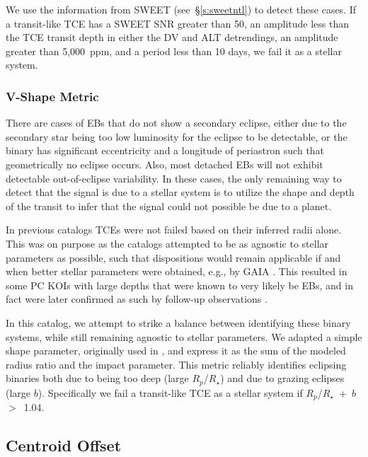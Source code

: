 We use the information from SWEET (see~\S\ref{s:sweetntl}) to detect these cases. If a transit-like TCE has a SWEET SNR greater than 50, an amplitude less than the TCE transit depth in either the DV and ALT detrendings, an amplitude greater than 5,000~ppm, and a period less than 10 days, we fail it as a stellar system.



\subsubsection{V-Shape Metric}
\label{s:shapemetric}
There are cases of EBs that do not show a secondary eclipse, either due to the secondary star being too low luminosity for the eclipse to be detectable, or the binary has significant eccentricity and a longitude of periastron such that geometrically no eclipse occurs. Also, most detached EBs will not exhibit detectable out-of-eclipse variability. In these cases, the only remaining way to detect that the signal is due to a stellar system is to utilize the shape and depth of the transit to infer that the signal could not possible be due to a planet.

In previous catalogs \citep{Rowe2015cat,Mullally2015cat,Coughlin2016} TCEs were not failed based on their inferred radii alone. This was on purpose as the catalogs attempted to be as agnostic to stellar parameters as possible, such that dispositions would remain applicable if and when better stellar parameters were obtained, e.g., by GAIA \citep{Cacciari2009,Mignard2005}. This resulted in some PC KOIs with large depths that were known to very likely be EBs, and in fact were later confirmed as such by follow-up observations \citep{Santerne2016}.

In this catalog, we attempt to strike a balance between identifying these binary systems, while still remaining agnostic to stellar parameters. We adapted a simple shape parameter, originally used in \citet{Batalha2013}, and express it as the sum of the modeled radius ratio and the impact parameter. This metric reliably identifies eclipsing binaries both due to being too deep (large $R_{p}$/$R_{\star}$) and due to grazing eclipses (large $b$). Specifically we fail a transit-like TCE as a stellar system if $R_{p}$/$R_{\star}$~+~$b$~$>$~1.04.



\subsection{Centroid Offset}
